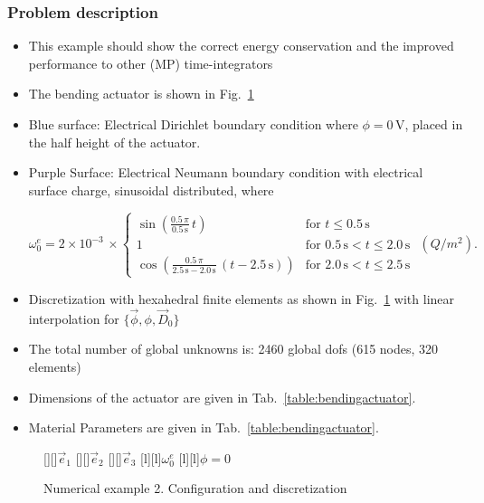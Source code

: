 \subsubsection{Problem description}
\begin{itemize}
\item This example should show the correct energy conservation and the improved performance to other (MP) time-integrators
\item The bending actuator is shown in Fig.~\ref{fig:bendingactuator}
\item Blue surface: Electrical Dirichlet boundary condition where $\phi=0\,\text{V}$, placed in the half height of the actuator.
\item Purple Surface: Electrical Neumann boundary condition with electrical surface charge, sinusoidal distributed, where\\
\begin{minipage}[h]{0.6\textwidth}
\centering
\begin{equation}
   \omega_0^e = 2\times 10^{-3}\,\times
   \begin{cases}
     \sin(\frac{0.5\,\pi}{0.5\,\text{s}}\,t) & \text{for } t \leq 0.5\,\text{s} \\
     1 & \text{for } 0.5\,\text{s} < t \leq 2.0\,\text{s} \\
     \cos(\frac{0.5\,\pi}{2.5\,\text{s}-2.0\,\text{s}}\,(t-2.5\,\text{s})) & \text{for } 2.0\,\text{s} < t \leq 2.5\,\text{s}
   \end{cases}\,\,(Q/m^2).
\end{equation}

\end{minipage}
%					
\item Discretization with hexahedral finite elements as shown in Fig.~\ref{fig:bendingactuator} with linear interpolation for $\{\vec{\phi}, \phi, \vec{D}_0\}$
\item The total number of global unknowns is: 2460 global dofs (615 nodes, 320 elements)
\item Dimensions of the actuator are given in Tab.~\ref{table:bendingactuator}.
\item Material Parameters are given in Tab.~\ref{table:bendingactuator}.
\end{itemize}
\begin{figure}[h!]
 \centering
   [][]{{$\vec{e}_1$}}
   [][]{{$\vec{e}_2$}}
   [][]{{$\vec{e}_3$}}
   [l][l]{{$\omega_0^e$}}
   [l][l]{{$\phi=0$}}
  \caption{Numerical example 2. Configuration and discretization}
  \label{fig:bendingactuator}
\end{figure}

